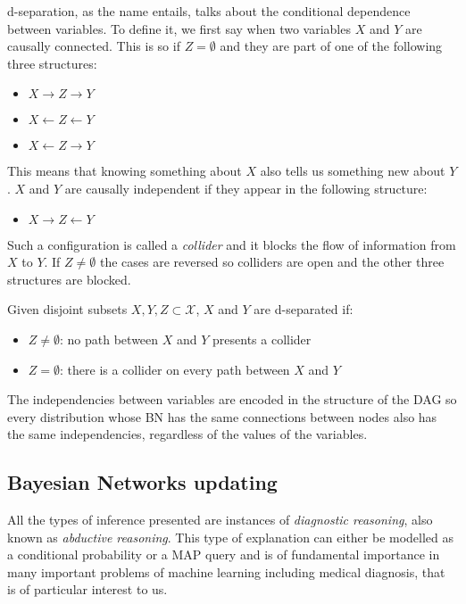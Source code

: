 d-separation, as the name entails, talks about the conditional dependence between variables.
To define it, we first say when two variables $X$ and $Y$ are causally connected.
This is so if $Z = \emptyset$ and they are part of one of the following three structures:
\begin{itemize}
  \item $X \rightarrow Z \rightarrow Y$
  \item $X \leftarrow Z \leftarrow Y$
  \item $X \leftarrow Z \rightarrow Y$
\end{itemize}
This means that knowing something about $X$ also tells us something new about $Y$.
$X$ and $Y$ are causally independent if they appear in the following structure:
\begin{itemize}
  \item $X \rightarrow Z \leftarrow  Y$
\end{itemize}
Such a configuration is called a \textit{collider} and it blocks the flow of information from $X$ to $Y$.
If $Z \neq \emptyset$ the cases are reversed so colliders are open and the other three structures are blocked.
\begin{definition}
	Given disjoint subsets $X, Y, Z \subset \mathcal{X}$, $X$ and $Y$ are d-separated if:
	\begin{itemize}
		\item $Z \neq \emptyset$: no path between $X$ and $Y$ presents a collider
		\item $Z = \emptyset$: there is a collider on every path between $X$ and $Y$
	\end{itemize}
\end{definition}

The independencies between variables are encoded in the structure of the DAG so every distribution whose BN has the same connections between nodes also has the same independencies, regardless of the values of the variables. 


\subsection{Bayesian Networks updating}
All the types of inference presented are instances of \textit{diagnostic reasoning}, also known as \textit{abductive reasoning}.  
This type of explanation can either be modelled as a conditional probability or a MAP query and is of fundamental importance in many important problems of machine learning including medical diagnosis, that is of particular interest to us.

